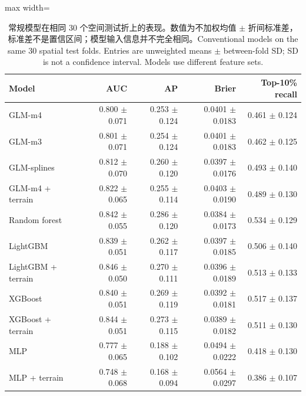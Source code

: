\begin{table}[htbp]\centering\small
\caption{\ifzh 常规模型在相同 30 个空间测试折上的表现。数值为不加权均值 $\pm$ 折间标准差，标准差不是置信区间；模型输入信息并不完全相同。\else Conventional models on the same 30 spatial test folds. Entries are unweighted means $\pm$ between-fold SD; SD is not a confidence interval. Models use different feature sets.\fi}\label{tab:spatialvalid}
\begin{adjustbox}{max width=\linewidth}
\begin{tabular}{lrrrr}\toprule
Model & AUC & AP & Brier & Top-10\% recall \\
\midrule
GLM-m4 & 0.800 $\pm$ 0.071 & 0.253 $\pm$ 0.124 & 0.0401 $\pm$ 0.0183 & 0.461 $\pm$ 0.124 \\
GLM-m3 & 0.801 $\pm$ 0.071 & 0.254 $\pm$ 0.124 & 0.0401 $\pm$ 0.0183 & 0.462 $\pm$ 0.125 \\
GLM-splines & 0.812 $\pm$ 0.070 & 0.260 $\pm$ 0.120 & 0.0397 $\pm$ 0.0176 & 0.493 $\pm$ 0.140 \\
GLM-m4 + terrain & 0.822 $\pm$ 0.065 & 0.255 $\pm$ 0.114 & 0.0403 $\pm$ 0.0190 & 0.489 $\pm$ 0.130 \\
Random forest & 0.842 $\pm$ 0.055 & 0.286 $\pm$ 0.120 & 0.0384 $\pm$ 0.0173 & 0.534 $\pm$ 0.129 \\
LightGBM & 0.839 $\pm$ 0.051 & 0.262 $\pm$ 0.117 & 0.0397 $\pm$ 0.0185 & 0.506 $\pm$ 0.140 \\
LightGBM + terrain & 0.846 $\pm$ 0.050 & 0.270 $\pm$ 0.111 & 0.0396 $\pm$ 0.0189 & 0.513 $\pm$ 0.133 \\
XGBoost & 0.840 $\pm$ 0.051 & 0.269 $\pm$ 0.119 & 0.0392 $\pm$ 0.0181 & 0.517 $\pm$ 0.137 \\
XGBoost + terrain & 0.844 $\pm$ 0.051 & 0.273 $\pm$ 0.115 & 0.0389 $\pm$ 0.0182 & 0.511 $\pm$ 0.130 \\
MLP & 0.777 $\pm$ 0.065 & 0.188 $\pm$ 0.102 & 0.0494 $\pm$ 0.0222 & 0.418 $\pm$ 0.130 \\
MLP + terrain & 0.748 $\pm$ 0.068 & 0.168 $\pm$ 0.094 & 0.0564 $\pm$ 0.0297 & 0.386 $\pm$ 0.107 \\
\bottomrule\end{tabular}
\end{adjustbox}
\end{table}
